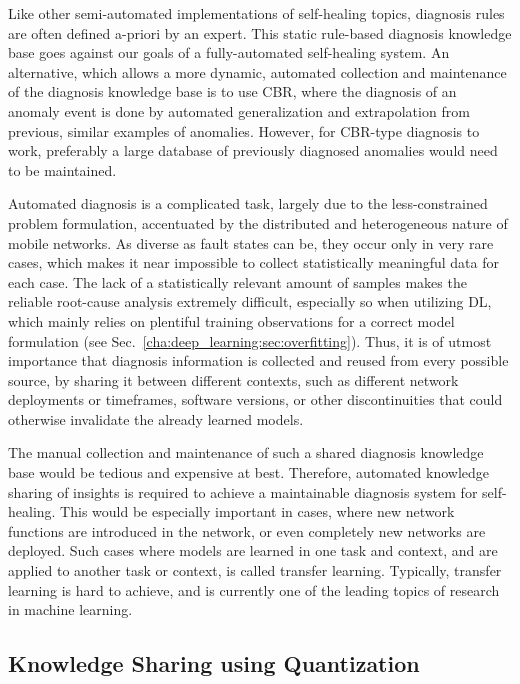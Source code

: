 			Like other semi-automated implementations of self-healing topics, diagnosis rules are often defined a-priori by an expert.
			This static rule-based diagnosis knowledge base goes against our goals of a fully-automated self-healing system.
			An alternative, which allows a more dynamic, automated collection and maintenance of the diagnosis knowledge base is to use \ac{CBR}, where the diagnosis of an anomaly event is done by automated generalization and extrapolation from previous, similar examples of anomalies.
			However, for \ac{CBR}-type diagnosis to work, preferably a large database of previously diagnosed anomalies would need to be maintained.
		
			Automated diagnosis is a complicated task, largely due to the less-constrained problem formulation, accentuated by the distributed and heterogeneous nature of mobile networks.
			As diverse as fault states can be, they occur only in very rare cases, which makes it near impossible to collect statistically meaningful data for each case.
			The lack of a statistically relevant amount of samples makes the reliable root-cause analysis extremely difficult, especially so when utilizing \ac{DL}, which mainly relies on plentiful training observations for a correct model formulation (see Sec.~\ref{cha:deep_learning:sec:overfitting}).
			Thus, it is of utmost importance that diagnosis information is collected and reused from every possible source, by sharing it between different contexts, such as different network deployments or timeframes, software versions, or other discontinuities that could otherwise invalidate the already learned models.
			
			The manual collection and maintenance of such a shared diagnosis knowledge base would be tedious and expensive at best.
			Therefore, automated knowledge sharing of insights is required to achieve a maintainable diagnosis system for self-healing.
			This would be especially important in cases, where new network functions are introduced in the network, or even completely new networks are deployed.
			Such cases where models are learned in one task and context, and are applied to another task or context, is called transfer learning.
			Typically, transfer learning is hard to achieve, and is currently one of the leading topics of research in machine learning.
		
		\subsection{Knowledge Sharing using Quantization}
		
